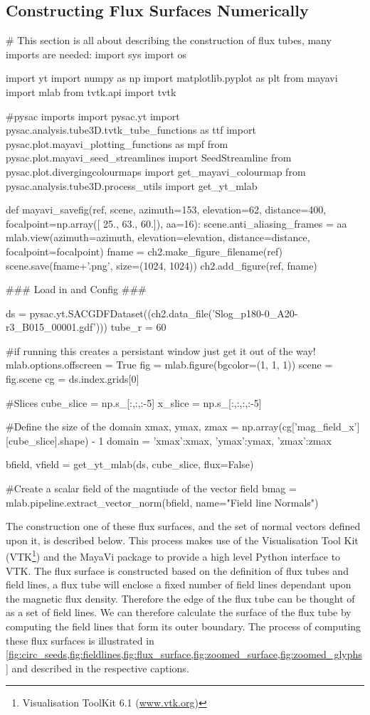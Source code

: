 \subsection{Constructing Flux Surfaces Numerically}
\begin{pycode}[chapter2]
# This section is all about describing the construction of flux tubes, many imports are needed:
import sys
import os

import yt
import numpy as np
import matplotlib.pyplot as plt
from mayavi import mlab
from tvtk.api import tvtk

#pysac imports
import pysac.yt
import pysac.analysis.tube3D.tvtk_tube_functions as ttf
import pysac.plot.mayavi_plotting_functions as mpf
from pysac.plot.mayavi_seed_streamlines import SeedStreamline
from pysac.plot.divergingcolourmaps import get_mayavi_colourmap
from pysac.analysis.tube3D.process_utils import get_yt_mlab

def mayavi_savefig(ref, scene, azimuth=153, elevation=62, distance=400, focalpoint=np.array([  25.,   63.,  60.]), aa=16):
    scene.anti_aliasing_frames = aa
    mlab.view(azimuth=azimuth, elevation=elevation, distance=distance, focalpoint=focalpoint)
    fname = ch2.make_figure_filename(ref)
    scene.save(fname+'.png', size=(1024, 1024))
    ch2.add_figure(ref, fname)


### Load in and Config ###

ds = pysac.yt.SACGDFDataset((ch2.data_file('Slog_p180-0_A20-r3_B015_00001.gdf')))
tube_r = 60

#if running this creates a persistant window just get it out of the way!
mlab.options.offscreen = True
fig = mlab.figure(bgcolor=(1, 1, 1))
scene = fig.scene
cg = ds.index.grids[0]

#Slices
cube_slice = np.s_[:,:,:-5]
x_slice = np.s_[:,:,:,:-5]

#Define the size of the domain
xmax, ymax, zmax = np.array(cg['mag_field_x'][cube_slice].shape) - 1
domain = {'xmax':xmax, 'ymax':ymax, 'zmax':zmax}

bfield, vfield = get_yt_mlab(ds, cube_slice, flux=False)

#Create a scalar field of the magntiude of the vector field
bmag = mlab.pipeline.extract_vector_norm(bfield, name="Field line Normals")
\end{pycode}

The construction one of these flux surfaces, and the set of normal vectors defined upon it, is described below.
This process makes use of the Visualisation Tool Kit (VTK\footnote{Visualisation ToolKit 6.1 (\url{www.vtk.org})}) and the MayaVi package \cite{Ramachandran2011} to provide a high level Python interface to VTK.
The flux surface is constructed based on the definition of flux tubes and field lines, a flux tube will enclose a fixed number of field lines dependant upon the magnetic flux density.
Therefore the edge of the flux tube can be thought of as a set of field lines.
We can therefore calculate the surface of the flux tube by computing the field lines that form its outer boundary.
The process of computing these flux surfaces is illustrated in \cref{fig:circ_seeds,fig:fieldlines,fig:flux_surface,fig:zoomed_surface,fig:zoomed_glyphs} and described in the respective captions.

